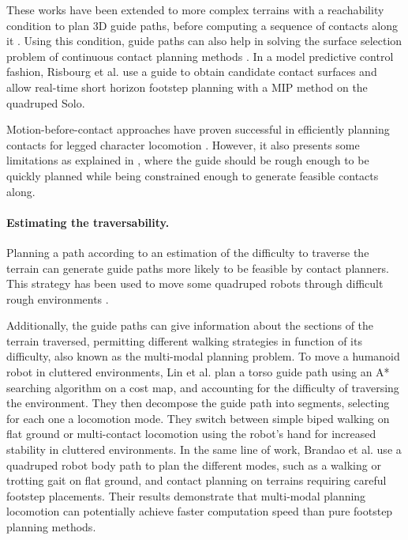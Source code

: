 These works have been extended to more complex terrains with a reachability condition to plan 3D guide paths, before computing a sequence of contacts along it \cite{RB-PRM, AcyclicCP, rough_terrain_reachability_hutter_2021}.
Using this condition, guide paths can also help in solving the surface selection problem of continuous contact planning methods \cite{sl1m_v2}.
In a model predictive control fashion, Risbourg et al. \cite{fanny_mip_solo} 
use a guide to obtain candidate contact surfaces and allow real-time short horizon footstep planning with a MIP method on the quadruped Solo.

Motion-before-contact approaches have proven successful in efficiently planning contacts for legged character locomotion \cite{egges_2010, bouyarmane_2009, bouyarmane2018}.
However, it also presents some limitations as explained in \cite{escande_2008}, where the guide should be rough enough to be quickly planned while being constrained enough to generate feasible contacts along.


\paragraph{Estimating the traversability.}
Planning a path according to an estimation of the difficulty to traverse the terrain can generate guide paths more likely to be feasible by contact planners.
This strategy has been used to move some quadruped robots through difficult rough environments \cite{kolter_2008, terrain_map_mrinal_2011, winkler_2014, winkler_carlos_2015, wermelinger_2016}. 

Additionally, the guide paths can give information about the sections of the terrain traversed, permitting different walking strategies in function of its difficulty, also known as the multi-modal planning problem.
To move a humanoid robot in cluttered environments, Lin et al. \cite{lin_traversability_2018} plan a torso guide path using an A* searching algorithm on a cost map, and accounting for the difficulty of traversing the environment. 
They then decompose the guide path into segments, selecting for each one a locomotion mode. They switch between simple biped walking on flat ground or multi-contact locomotion using the robot's hand for increased stability in cluttered environments.
In the same line of work, Brandao et al. \cite{brandao_multimode_2019} use a quadruped robot body path to plan the different modes, such as a walking or trotting gait on flat ground, and contact planning on terrains requiring careful footstep placements.
Their results demonstrate that multi-modal planning locomotion can potentially achieve faster computation speed than pure footstep planning methods.

